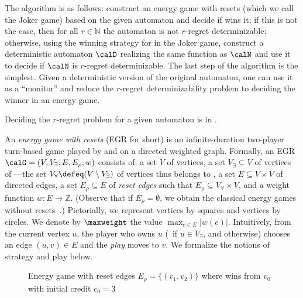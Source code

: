 \documentclass[a4paper]{article}
\begin{document}
The algorithm is as follows: construct an energy game with resets (which we call
the Joker game) based on the given automaton and decide if \eve wins it; if this
is not the case, then for all $r \in \mathbb{N}$ the automaton is not $r$-regret
determinizable; otherwise, using the winning strategy for \eve in the Joker
game, construct a deterministic automaton $\calD$ realizing the same function as
$\calN$ and use it to decide if $\calN$ is $r$-regret determinizable. The last
step of the algorithm is the simplest. Given a deterministic version of the
original automaton, one can use it as a ``monitor'' and reduce the $r$-regret
determinizability problem to deciding the winner in an energy game.
\begin{theorem}\label{thm:regret-upper}
	Deciding the $r$-regret problem for a given automaton is in
	\EXP.
\end{theorem}

An \emph{energy game with resets} (EGR for short) is an infinite-duration
two-player turn-based game played by \eve and \adam on a directed weighted
graph. Formally, an EGR $\calG = (V,V_\exists, E, E_\rho,w)$ consists of: a set
$V$ of vertices, a set $V_\exists \subseteq V$ of vertices of \eve---the set
$V_\forall \defeq
(V \setminus V_\exists)$ of vertices thus belongs to \adam, a set $E \subseteq
V \times V$ of directed edges, a set $E_\rho \subseteq E$ of \emph{reset edges}
such that $E_\rho \subseteq V_\forall \times V$, and a weight
function $w : E \to \mathbb{Z}$.
(Observe that if $E_\rho = \emptyset$, we obtain the classical energy
games without resets~\cite{cdahs03}.)
Pictorially, we represent \eve vertices by
squares and \adam vertices by circles. We denote by $\maxweight$ the value
$\max_{e \in E} |w(e)|$.  Intuitively, from the current vertex $u$, the player
who owns $u$ (\ie~\eve if $u \in V_\exists$, and \adam otherwise)
chooses an edge $(u,v) \in
E$ and the \emph{play} moves to $v$. We formalize the notions of strategy and
play below. 

\begin{figure}
\begin{center}
\caption{Energy game with reset edges $E_\rho = \{(v_1,v_2)\}$ where \eve wins
from $v_0$ with initial credit $c_0 = 3$}
\label{fig:egr-example}
\end{center}
\end{figure}
\end{document}
